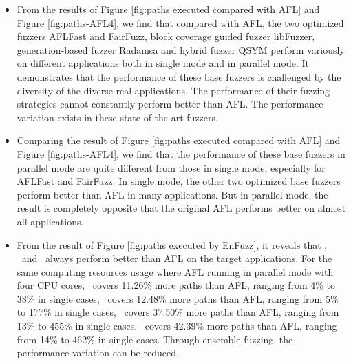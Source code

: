 \begin{itemize}

\item From the results of Figure \ref{fig:paths executed compared with AFL} and Figure \ref{fig:paths-AFL4}, we find that compared with AFL, the two optimized fuzzers AFLFast and FairFuzz, block coverage guided fuzzer libFuzzer, generation-based fuzzer Radamsa and hybrid fuzzer QSYM perform variously on different applications both in single mode and in parallel mode. It demonstrates that the performance of these base fuzzers is challenged by the diversity of the diverse real applications. %
The performance of their fuzzing strategies cannot constantly perform better than AFL. The performance variation exists in these state-of-the-art fuzzers. %

\item Comparing the result of Figure \ref{fig:paths executed compared with AFL} and Figure \ref{fig:paths-AFL4}, we find that the performance of these base fuzzers in parallel mode are quite different from those in single mode, especially for AFLFast and FairFuzz. In single mode, the other two optimized base fuzzers perform better than AFL in many applications. But in parallel mode, the result is completely opposite that the original AFL performs better on almost all applications. %

\item From the result of Figure \ref{fig:paths executed by EnFuzz}, it reveals that \toolOne, \toolTwo ~and \toolThree ~always perform better than AFL on the target applications.
For the same computing resources usage where AFL running in parallel mode with four CPU cores, \toolOne ~covers 11.26\% more paths than AFL, ranging from 4\% to 38\% in single cases, \toolFive ~covers 12.48\% more paths than AFL, ranging from 5\% to 177\% in single cases, \toolTwo ~covers 37.50\% more paths than AFL, ranging from 13\% to 455\% in single cases.
\toolThree ~covers 42.39\% more paths than AFL, ranging from 14\% to 462\% in single cases.
Through ensemble fuzzing, the performance variation can be reduced. %


\end{itemize}
